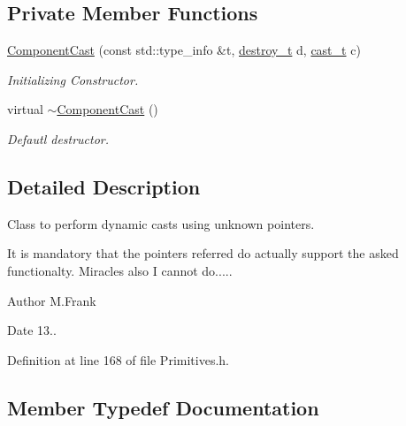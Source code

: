 \subsection*{Private Member Functions}
\begin{DoxyCompactItemize}
\item 
\hyperlink{class_d_d4hep_1_1_component_cast_a6a1068534a7f7287cd1f4a342c34a91a}{Component\+Cast} (const std\+::type\+\_\+info \&t, \hyperlink{class_d_d4hep_1_1_component_cast_a846aa2764437b52901326d56a1092c59}{destroy\+\_\+t} d, \hyperlink{class_d_d4hep_1_1_component_cast_af22751cad5f2f61dbae30c26c91ac621}{cast\+\_\+t} c)
\begin{DoxyCompactList}\small\item\em Initializing Constructor. \end{DoxyCompactList}\item 
virtual \hyperlink{class_d_d4hep_1_1_component_cast_a1554d35b906921cba45fc717702ff8c4}{$\sim$\+Component\+Cast} ()
\begin{DoxyCompactList}\small\item\em Defautl destructor. \end{DoxyCompactList}\end{DoxyCompactItemize}


\subsection{Detailed Description}
Class to perform dynamic casts using unknown pointers. 

It is mandatory that the pointers referred do actually support the asked functionalty. Miracles also I cannot do.....

\begin{DoxyAuthor}{Author}
M.\+Frank 
\end{DoxyAuthor}
\begin{DoxyDate}{Date}
13.. 
\end{DoxyDate}


Definition at line 168 of file Primitives.\+h.



\subsection{Member Typedef Documentation}
\hypertarget{class_d_d4hep_1_1_component_cast_af22751cad5f2f61dbae30c26c91ac621}{}\label{class_d_d4hep_1_1_component_cast_af22751cad5f2f61dbae30c26c91ac621} 

